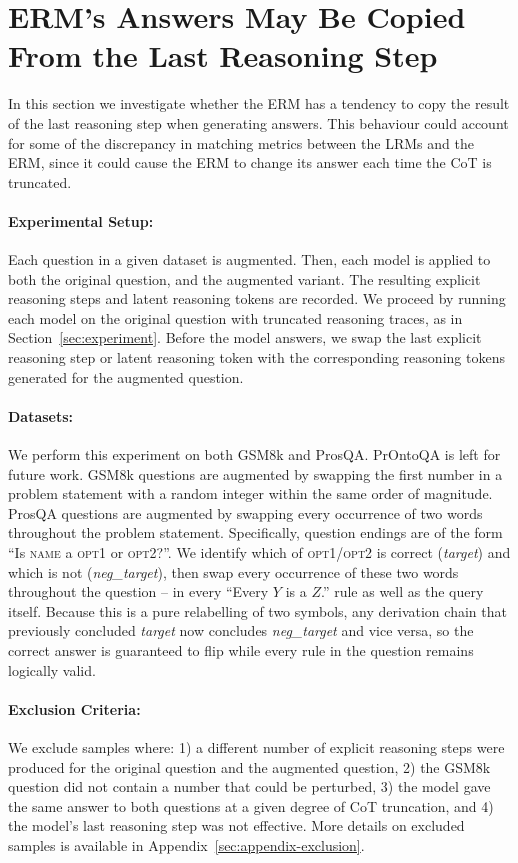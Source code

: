 \documentclass[11pt]{article}
\begin{document}
\section{ERM's Answers May Be Copied From the Last Reasoning Step}
\label{sec:copying}

In this section we investigate whether the ERM has a tendency to copy the result of the last reasoning step when generating answers. This behaviour could account for some of the discrepancy in matching metrics between the LRMs and the ERM, since it could cause the ERM to change its answer each time the CoT is truncated.

\paragraph{Experimental Setup:} Each question in a given dataset is augmented. Then, each model is applied to both the original question, and the augmented variant. The resulting explicit reasoning steps and latent reasoning tokens are recorded. We proceed by running each model on the original question with truncated reasoning traces, as in Section~\ref{sec:experiment}. Before the model answers, we swap the last explicit reasoning step or latent reasoning token with the corresponding reasoning tokens generated for the augmented question.

\paragraph{Datasets:} We perform this experiment on both GSM8k and ProsQA. PrOntoQA is left for future work. GSM8k questions are augmented by swapping the first number in a problem statement with a random integer within the same order of magnitude. ProsQA questions are augmented by swapping every occurrence of two words throughout the problem statement. Specifically, question endings are of the form ``Is \textsc{name} a \textsc{opt1} or \textsc{opt2}?''. We identify which of \textsc{opt1}/\textsc{opt2} is correct (\emph{target}) and which is not (\emph{neg\_target}), then swap every occurrence of these two words throughout the question -- in every ``Every $Y$ is a $Z$.'' rule as well as the query itself. Because this is a pure relabelling of two symbols, any derivation chain that previously concluded \emph{target} now concludes \emph{neg\_target} and vice versa, so the correct answer is guaranteed to flip while every rule in the question remains logically valid.

\paragraph{Exclusion Criteria:} We exclude samples where: 1) a different number of explicit reasoning steps were produced for the original question and the augmented question, 2) the GSM8k question did not contain a number that could be perturbed, 3) the model gave the same answer to both questions at a given degree of CoT truncation, and 4) the model's last reasoning step was not effective. More details on excluded samples is available in Appendix~\ref{sec:appendix-exclusion}.
\end{document}
